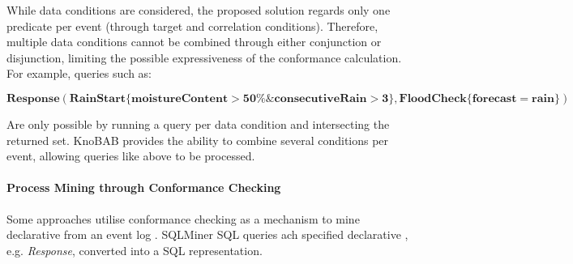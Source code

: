 While data conditions are considered, the proposed solution regards only one predicate per event (through target and correlation conditions). Therefore, multiple data conditions cannot be combined through either conjunction or disjunction, limiting the possible expressiveness of the conformance calculation. For example, queries such as:

$\mathbf{Response(RainStart \{moistureContent>50\%  \& consecutiveRain>3\}, FloodCheck\{forecast=rain\})}$

Are only possible by running a query per data condition and intersecting the returned set. KnoBAB provides the ability to combine several conditions per event, allowing queries like above to be processed.


\paragraph*{Process Mining through Conformance Checking}
Some approaches utilise conformance checking as a mechanism to mine declarative   from an event log . SQLMiner \cite{SchonigRCJM16}  SQL queries \cite{Schonig15} ach specified declarative , e.g. \emph{Response},  converted into a SQL representation.  


